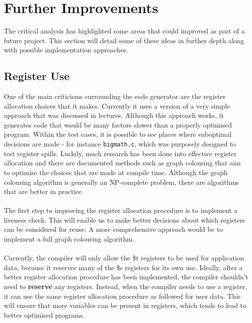 \chapter{Further Improvements}

The critical analysis has highlighted some areas that could improved as part of a future project. This section will detail some of these ideas in further depth along with possible implementation approaches.

\section{Register Use}
One of the main criticisms surrounding the code generator are the register allocation choices that it makes. Currently it uses a version of a very simple approach that was discussed in lectures. Although this approach works, it generates code that would be many factors slower than a properly optimised program. Within the test cases, it is possible to see places where suboptimal decisions are made - for instance \verb!bigmath.c!, which was purposely designed to test register spills. Luckily, much research has been done into effective register allocation and there are documented methods such as graph colouring that aim to optimise the choices that are made at compile time. Although the graph colouring algorithm is generally an NP-complete problem, there are algorithms that are better in practice.
\ \\ \ \\
The first step to improving the register allocation procedure is to implement a liveness check. This will enable us to make better decisions about which registers can be considered for reuse. A more comprehensive approach would be to implement a full graph colouring algorithm.
\ \\ \ \\
Currently, the compiler will only allow the \$t registers to be used for application data, because it reserves many of the \$s registers for its own use. Ideally, after a better register allocation procedure has been implemented, the compiler shouldn't need to \textbf{reserve} any registers. Instead, when the compiler needs to use a register, it can use the same register allocation procedure as followed for user data. This will ensure that more variables can be present in registers, which tends to lead to better optimised programs.
